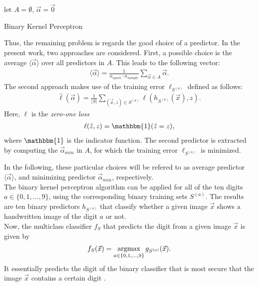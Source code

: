 \begin{algorithm}[H]
\SetAlgoLined
{}
 let $A = \emptyset$, $\vec{\alpha} = \vec{0}$\;
\caption{Binary Kernel Perceptron}
\label{alg:binary_kernel_perceptron}
\end{algorithm}

Thus, the remaining problem is regards the good choice of a predictor. In the present work, two approaches are considered. First, a possible choice is the average $\langle \vec{\alpha} \rangle$ over all predictors in $A$. This leads to the following vector:
\begin{align*}
	\langle \vec{\alpha} \rangle = \frac{1}{n_{epoch} \cdot n_{sample}} 			\sum_{\vec{\alpha} \in A} \vec{\alpha}.
\end{align*}
The second approach makes use of the training error $\ell_{S^{(a)}}$ defined as follows:
\begin{align*}
	\hat{\ell}(\vec{\alpha}) = \frac{1}{|S|} 										\sum_{(\vec{x}, z) \in S^{(a)}} \ell(h_{S^{(a)}}(\vec{x}), z).
\end{align*}
Here, $\ell$ is the \textit{zero-one loss}
\begin{align*}
	\ell(\hat{z}, z) = \mathbbm{1}(\hat{z} = z),
\end{align*}
where $\mathbbm{1}$ is the indicator function. The second predictor is extracted by computing the $\vec{\alpha}_{min}$ in $A$, for which the training error $\ell_{S^{(a)}}$ is minimized. 

In the following, these particular choices will be refered to as average predictor $\langle \vec{\alpha} \rangle$, and minimizing predictor $\vec{\alpha}_{min}$, respectively.\\

The binary kernel perceptron algorithm can be applied for all of the ten digits $a \in \{0, 1, \dots, 9\}$, using the corresponding binary training sets $S^{(a)}$. The results are ten binary predictors $h_{S^{(a)}}$ that classify whether a given image $\vec{x}$ shows a handwritten image of the digit $a$ or not. \\

Now, the multiclass classifier $f_S$ that predicts the digit from a given image $\vec{x}$ is given by 
\begin{align*}
	f_S(\vec{x}) = \operatorname*{argmax}_{a \in \{0, 1, \dots, 9\}} g_{S^{(a)}}(\vec{x}).
\end{align*} 
It essentially predicts the digit of the binary classifier that is most secure that the image $\vec{x}$ contains a certain digit \cite{multiclass2005}.